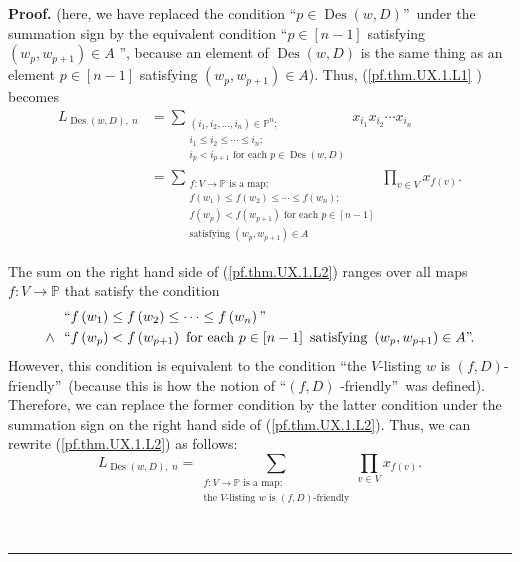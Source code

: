 \documentclass[numbers=enddot,12pt,final,onecolumn,notitlepage]{scrartcl}%
\numberwithin{exer}{section}
\theoremstyle{definition}
\newenvironment{proof}[1][Proof]{\noindent\textbf{#1.} }{\ \rule{0.5em}{0.5em}}
\let\sumnonlimits\sum
\let\prodnonlimits\prod
\renewcommand{\sum}{\sumnonlimits\limits}
\renewcommand{\prod}{\prodnonlimits\limits}
\begin{document}
\begin{proof}
(here, we have replaced the condition \textquotedblleft$p\in
\operatorname*{Des}\left(  w,D\right)  $\textquotedblright\ under the
summation sign by the equivalent condition \textquotedblleft$p\in\left[
n-1\right]  $ satisfying $\left(  w_{p},w_{p+1}\right)  \in A$%
\textquotedblright, because an element of $\operatorname*{Des}\left(
w,D\right)  $ is the same thing as an element $p\in\left[  n-1\right]  $
satisfying $\left(  w_{p},w_{p+1}\right)  \in A$). Thus, (\ref{pf.thm.UX.1.L1}%
) becomes%
\begin{align}
L_{\operatorname*{Des}\left(  w,D\right)  ,\ n}  &  =\sum_{\substack{\left(
i_{1},i_{2},\ldots,i_{n}\right)  \in\mathbb{P}^{n};\\i_{1}\leq i_{2}\leq
\cdots\leq i_{n};\\i_{p}<i_{p+1}\text{ for each }p\in\operatorname*{Des}%
\left(  w,D\right)  }}x_{i_{1}}x_{i_{2}}\cdots x_{i_{n}}\nonumber\\
&  =\sum_{\substack{f:V\rightarrow\mathbb{P}\text{ is a map};\\f\left(
w_{1}\right)  \leq f\left(  w_{2}\right)  \leq\cdots\leq f\left(
w_{n}\right)  ;\\f\left(  w_{p}\right)  <f\left(  w_{p+1}\right)  \text{ for
each }p\in\left[  n-1\right]  \\\text{satisfying }\left(  w_{p},w_{p+1}%
\right)  \in A}}\prod_{v\in V}x_{f\left(  v\right)  }. \label{pf.thm.UX.1.L2}%
\end{align}


The sum on the right hand side of (\ref{pf.thm.UX.1.L2}) ranges over all maps
$f:V\rightarrow\mathbb{P}$ that satisfy the condition
\begin{align*}
&  \ \ \text{\textquotedblleft}f\left(  w_{1}\right)  \leq f\left(
w_{2}\right)  \leq\cdots\leq f\left(  w_{n}\right)  \text{\textquotedblright%
}\\
\wedge &  \text{\ \ \textquotedblleft}f\left(  w_{p}\right)  <f\left(
w_{p+1}\right)  \text{ for each }p\in\left[  n-1\right]  \text{ satisfying
}\left(  w_{p},w_{p+1}\right)  \in A\text{\textquotedblright.}%
\end{align*}
However, this condition is equivalent to the condition \textquotedblleft the
$V$-listing $w$ is $\left(  f,D\right)  $-friendly\textquotedblright\ (because
this is how the notion of \textquotedblleft$\left(  f,D\right)  $%
-friendly\textquotedblright\ was defined). Therefore, we can replace the
former condition by the latter condition under the summation sign on the right
hand side of (\ref{pf.thm.UX.1.L2}). Thus, we can rewrite
(\ref{pf.thm.UX.1.L2}) as follows:%
\begin{equation}
L_{\operatorname*{Des}\left(  w,D\right)  ,\ n}=\sum_{\substack{f:V\rightarrow
\mathbb{P}\text{ is a map};\\\text{the }V\text{-listing }w\text{ is }\left(
f,D\right)  \text{-friendly}}}\prod_{v\in V}x_{f\left(  v\right)  }.
\label{pf.thm.UX.1.L3}%
\end{equation}



\end{proof}
\end{document}
